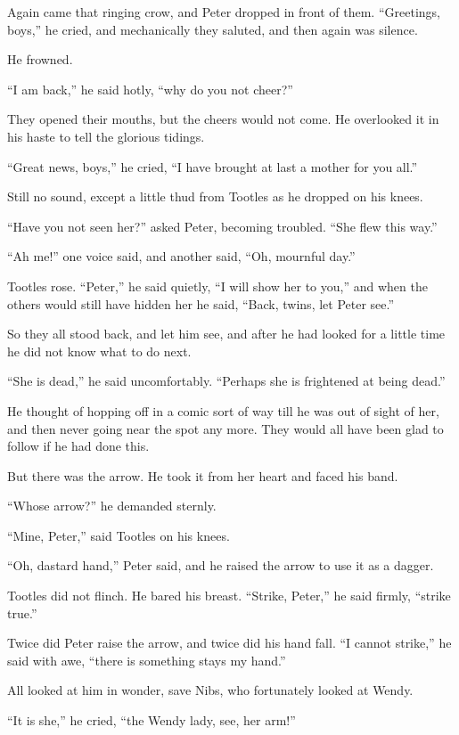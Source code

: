 Again came that ringing crow, and Peter dropped in front of them.
``Greetings, boys,'' he cried, and mechanically they saluted, and then again was
silence.

He frowned.

``I am back,'' he said hotly, ``why do you not cheer?''

They opened their mouths, but the cheers would not come.
He overlooked it in his haste to tell the glorious tidings.

``Great news, boys,'' he cried, ``I have brought at last a mother for you all.''

Still no sound, except a little thud from Tootles as he dropped on his knees.

``Have you not seen her?'' asked Peter, becoming troubled.
``She flew this way.''

``Ah me!'' one voice said, and another said, ``Oh, mournful day.''

Tootles rose.
``Peter,'' he said quietly, ``I will show her to you,'' and when the others
would still have hidden her he said, ``Back, twins, let Peter see.''

So they all stood back, and let him see, and after he had looked for a little
time he did not know what to do next.

``She is dead,'' he said uncomfortably.
``Perhaps she is frightened at being dead.''

He thought of hopping off in a comic sort of way till he was out of sight of
her, and then never going near the spot any more.
They would all have been glad to follow if he had done this.

But there was the arrow.
He took it from her heart and faced his band.

``Whose arrow?'' he demanded sternly.

``Mine, Peter,'' said Tootles on his knees.

``Oh, dastard hand,'' Peter said, and he raised the arrow to use it as a dagger.

Tootles did not flinch.
He bared his breast.
``Strike, Peter,'' he said firmly, ``strike true.''

Twice did Peter raise the arrow, and twice did his hand fall.
``I cannot strike,'' he said with awe, ``there is something stays my hand.''

All looked at him in wonder, save Nibs, who fortunately looked at Wendy.

``It is she,'' he cried, ``the Wendy lady, see, her arm!''

